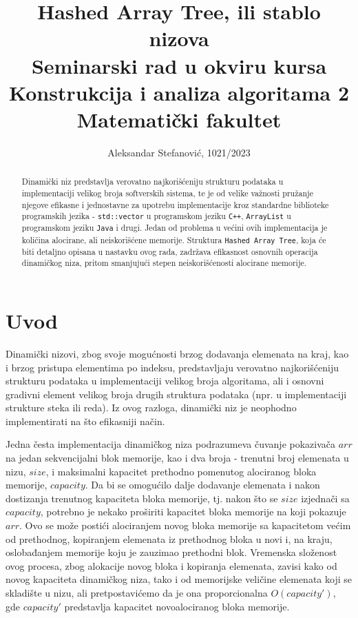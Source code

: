 \documentclass[a4paper]{article}
\title{Hashed Array Tree, ili stablo nizova\\ \small{Seminarski rad u okviru kursa\\Konstrukcija i analiza algoritama 2\\ Matematički fakultet}}
\author{Aleksandar Stefanović, 1021/2023}
\begin{document}
\maketitle

\begin{abstract}
Dinamički niz predstavlja verovatno najkorišćeniju strukturu podataka u implementaciji velikog broja softverskih sistema, te je od velike važnosti pružanje njegove efikasne i jednostavne za upotrebu implementacije kroz standardne biblioteke programskih jezika - \verb|std::vector| u programskom jeziku \verb|C++|, \verb|ArrayList| u programskom jeziku \verb|Java| i drugi. Jedan od problema u većini ovih implementacija je količina alocirane, ali neiskorišćene memorije. Struktura \verb|Hashed Array Tree|, koja će biti detaljno opisana u nastavku ovog rada, zadržava efikasnost osnovnih operacija dinamičkog niza, pritom smanjujući stepen neiskorišćenosti alocirane memorije.
\end{abstract}

\tableofcontents

\newpage

\section{Uvod}

Dinamički nizovi, zbog svoje mogućnosti brzog dodavanja elemenata na kraj, kao i brzog pristupa elementima po indeksu, predstavljaju verovatno najkorišćeniju strukturu podataka u implementaciji velikog broja algoritama, ali i osnovni gradivni element velikog broja drugih struktura podataka (npr. u implementaciji strukture steka ili reda). Iz ovog razloga, dinamički niz je neophodno implementirati na što efikasniji način.

Jedna česta implementacija dinamičkog niza podrazumeva čuvanje pokazivača $arr$ na jedan sekvencijalni blok memorije, kao i dva broja - trenutni broj elemenata u nizu, $size$, i maksimalni kapacitet prethodno pomenutog alociranog bloka memorije, $capacity$. Da bi se omogućilo dalje dodavanje elemenata i nakon dostizanja trenutnog kapaciteta bloka memorije, tj. nakon što se $size$ izjednači sa $capacity$, potrebno je nekako proširiti kapacitet bloka memorije na koji pokazuje $arr$. Ovo se može postići alociranjem novog bloka memorije sa kapacitetom većim od prethodnog, kopiranjem elemenata iz prethodnog bloka u novi i, na kraju, oslobađanjem memorije koju je zauzimao prethodni blok. Vremenska složenost ovog procesa, zbog alokacije novog bloka i kopiranja elemenata, zavisi kako od novog kapaciteta dinamičkog niza, tako i od memorijske veličine elemenata koji se skladište u nizu, ali pretpostavićemo da je ona proporcionalna $O(capacity')$, gde $capacity'$ predstavlja kapacitet novoalociranog bloka memorije.
\end{document}

